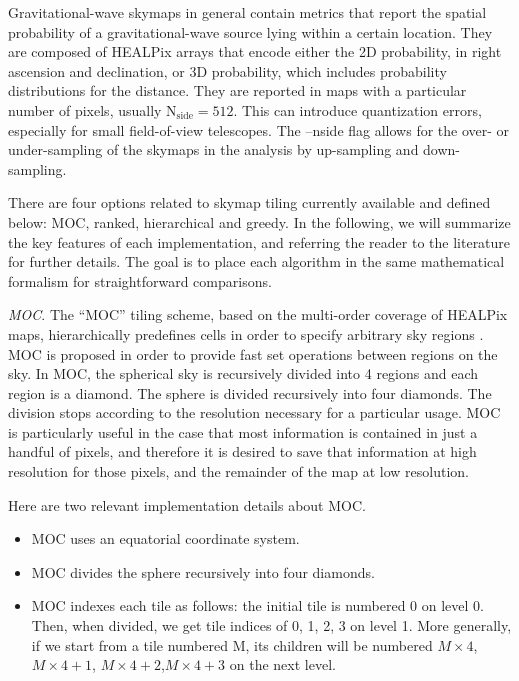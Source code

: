 \documentclass[twocolumn]{aastex62}
\begin{document}
Gravitational-wave skymaps in general contain metrics that report the spatial probability of a gravitational-wave source lying within a certain location.
They are composed of HEALPix arrays that encode either the 2D probability, in right ascension and declination, or 3D probability, which includes probability distributions for the distance.
They are reported in maps with a particular number of pixels, usually $\textrm{N}_\textrm{side} = 512$. 
This can introduce quantization errors, especially for small field-of-view telescopes. 
The --nside flag allows for the over- or under-sampling of the skymaps in the analysis by up-sampling and down-sampling.

There are four options related to skymap tiling currently available and defined below: MOC, ranked, hierarchical and greedy.
In the following, we will summarize the key features of each implementation, and referring the reader to the literature for further details.
The goal is to place each algorithm in the same mathematical formalism for straightforward comparisons.

\emph{MOC}. The ``MOC'' tiling scheme, based on the  multi-order coverage of HEALPix maps, hierarchically predefines cells in order to specify arbitrary sky regions \citep{FeBo2014}. 
MOC is proposed in order to provide fast set operations between regions on the sky. In MOC, the spherical sky is recursively divided into 4 regions and each region is a diamond. 
The sphere is divided recursively into four diamonds. 
The division stops according to the resolution necessary for a particular usage.
MOC is particularly useful in the case that most information is contained in just a handful of pixels, and therefore it is desired to save that information at high resolution for those pixels, and the remainder of the map at low resolution.

Here are two relevant implementation details about MOC.
\begin{itemize}
\item MOC uses an equatorial coordinate system. 
\item MOC divides the sphere recursively into four diamonds. 
\item MOC indexes each tile as follows: the initial tile is numbered 0 on level 0. Then, when divided, we get tile indices of 0, 1, 2, 3 on level 1. More generally, if we start from a tile numbered M, its children will be numbered $M\times 4$, $M\times 4 + 1$, $M\times 4 + 2$,$M\times 4 + 3$ on the next level.
\end{itemize}
\end{document}

